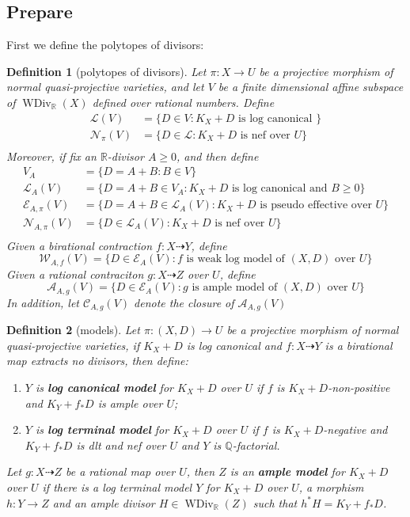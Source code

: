 \documentclass{article}
\newtheorem{defn}{Definition}[subsection]
\begin{document}
\subsection{Prepare}
First we define the polytopes of divisors: 
\begin{defn}[polytopes of divisors]\label{polytopeofdivisor}
  Let $ \pi:X\to U $ be a projective morphism of normal quasi-projective varieties, and  let $ V $ be a finite dimensional affine subspace of $ \operatorname{WDiv}_{\mathbb{R}}(X) $ defined over rational numbers. Define
  \[
    \begin{aligned}
      \mathcal{L}(V)&=\{D\in V: K_X+D \text{ is log canonical }\} \\
      \mathcal{N}_\pi(V)&=\{D\in\mathcal{L}:K_X+D \text{ is nef over } U\}\\
    \end{aligned}
  \]
  Moreover, if fix an $ \mathbb{R} $-divisor $ A\geqslant 0 $, and then define
  \[
    \begin{aligned}
      V_A&=\{D=A+B:B\in V\}\\
      \mathcal{L}_A(V)&=\{D=A+B\in V_A: K_X+D \text{ is log canonical and  } B\geqslant0 \}\\
      \mathcal{E}_{A,\pi}(V)&=\{D=A+B\in \mathcal{L}_A(V): K_X+D \text{ is pseudo effective over } U\}\\ 
      \mathcal{N}_{A,\pi}(V)&=\{D\in\mathcal{L}_A(V):K_X+D \text{ is nef over } U\}\\
    \end{aligned}
  \]
  Given a birational contraction $ f:X \dashrightarrow Y $, define
  \[ \mathcal{W}_{A,f}(V)=\{D\in \mathcal{E}_{A}(V): f \text{ is weak log model of  } (X,D) \text{ over }U\} \]
  Given a rational contraciton $g:X\dashrightarrow Z  $ over $ U $, define
  \[ \mathcal{A}_{A,g}(V)=\{D\in \mathcal{E}_{A}(V): g \text{ is ample model of  } (X,D) \text{ over }U\} \]
  In addition, let $ \mathcal{C}_{A,g}(V) $ denote the closure of $ \mathcal{A}_{A,g}(V) $
\end{defn}
\begin{defn}[models]\label{models}
  Let $ \pi:(X,D)\to U $ be a projective morphism of normal quasi-projective varieties, if $ K_X+D $ is log canonical and $ f:X\dashrightarrow Y $ is a birational map extracts no divisors, then define:
  \begin{enumerate}
    \item $ Y $ is \textbf{ log canonical model} for $ K_X+D $ over $ U $ if $ f $ is $ K_X+D $-non-positive and $ K_Y+f_*D $ is ample over $ U $;
    \item $ Y $ is \textbf{ log terminal model} for $ K_X+D $ over $ U $ if $ f $ is $ K_X+D $-negative and $ K_Y+f_*D $ is dlt and nef over $ U $ and $ Y $ is $ \mathbb{Q} $-factorial.
  \end{enumerate}
  Let $ g:X\dashrightarrow Z $ be a rational map over $ U $, then $ Z $ is an \textbf{ample model } for $ K_X+D $ over $ U $ if there is a log terminal model $ Y $ for $ K_X+D $ over $ U $, a morphism $ h:Y\to Z $ and an ample divisor $ H\in \operatorname{WDiv}_{\mathbb{R}}(Z) $ such that $ h^*H=K_Y+f_*D $. 
\end{defn}
\end{document}
